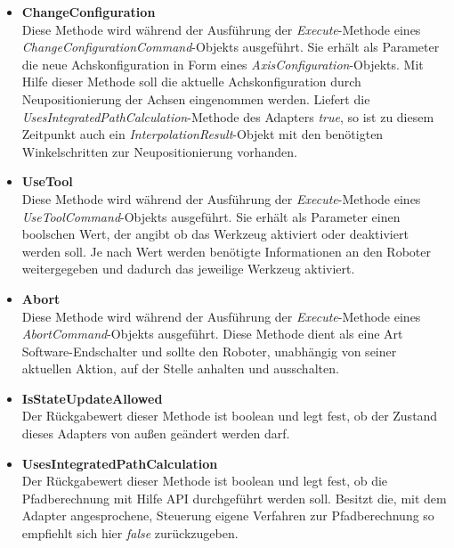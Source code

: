\begin{itemize}
\item \textbf{ChangeConfiguration}\\
Diese Methode wird während der Ausführung der \textit{Execute}-Methode eines \textit{ChangeConfigurationCommand}-Objekts ausgeführt. Sie erhält als Parameter die neue Achskonfiguration in Form eines \textit{AxisConfiguration}-Objekts. 
Mit Hilfe dieser Methode soll die aktuelle Achskonfiguration durch Neupositionierung der Achsen eingenommen werden. Liefert die \textit{UsesIntegratedPathCalculation}-Methode des Adapters \textit{true}, so ist zu diesem Zeitpunkt auch ein \textit{InterpolationResult}-Objekt mit den benötigten Winkelschritten zur Neupositionierung vorhanden.
\item \textbf{UseTool}\\
Diese Methode wird während der Ausführung der \textit{Execute}-Methode eines \textit{UseToolCommand}-Objekts ausgeführt. Sie erhält als Parameter einen boolschen Wert, der angibt ob das Werkzeug aktiviert oder deaktiviert werden soll. Je nach Wert werden benötigte Informationen an den Roboter weitergegeben und dadurch das jeweilige Werkzeug aktiviert.
\item \textbf{Abort}\\
Diese Methode wird während der Ausführung der \textit{Execute}-Methode eines \textit{AbortCommand}-Objekts ausgeführt. Diese Methode dient als eine Art Software-Endschalter und sollte den Roboter, unabhängig von seiner aktuellen Aktion, auf der Stelle anhalten und ausschalten. 
\item \textbf{IsStateUpdateAllowed}\\
Der Rückgabewert dieser Methode ist boolean und legt fest, ob der Zustand dieses Adapters von außen geändert werden darf.
\item \textbf{UsesIntegratedPathCalculation}\\
Der Rückgabewert dieser Methode ist boolean und legt fest, ob die Pfadberechnung mit Hilfe API durchgeführt werden soll. Besitzt die, mit dem Adapter angesprochene, Steuerung eigene Verfahren zur Pfadberechnung so empfiehlt sich hier \textit{false} zurückzugeben.
\end{itemize}

